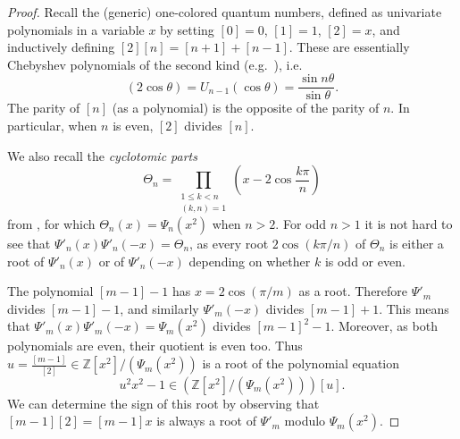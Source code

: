\documentclass{amsart}
\theoremstyle{plain}
\theoremstyle{definition}
\theoremstyle{remark}
\numberwithin{equation}{section}
\newcommand{\defnemph}[1]{\emph{#1}}
\newcommand{\ZZ}{\mathbb{Z}}
\begin{document}
\begin{proof}
Recall the (generic) one-colored quantum numbers, defined as univariate polynomials in a variable $x$ by setting $[0]=0$, $[1]=1$, $[2]=x$, and inductively defining $[2][n]=[n+1]+[n-1]$.
These are essentially Chebyshev polynomials of the second kind (e.g.~\cite[\S 3]{2colJW}), i.e.
\begin{equation*}
[n](2\cos \theta)=U_{n-1}(\cos \theta)=\frac{\sin n\theta}{\sin \theta} \text{.} %
\end{equation*}
The parity of $[n]$ (as a polynomial) is the opposite of the parity of $n$. 
In particular, when $n$ is even, $[2]$ divides $[n]$.

We also recall the \defnemph{cyclotomic parts}
\begin{equation*}
\Theta_n = \prod_{\substack{1 \leq k<n\\ (k,n)=1}} \left(x-2\cos \frac{k\pi}{n}\right)
\end{equation*}
from \cite[\S 3]{2colJW}, for which $\Theta_n(x)=\Psi_n(x^2)$ when $n>2$. 
For odd $n>1$ it is not hard to see that $\Psi'_n(x)\Psi'_n(-x)=\Theta_n$, as every root $2\cos(k\pi/n)$ of $\Theta_n$ is either a root of $\Psi'_n(x)$ or of $\Psi'_n(-x)$ depending on whether $k$ is odd or even.

The polynomial $[m-1]-1$ has $x=2\cos(\pi/m)$ as a root. 
Therefore $\Psi'_m$ divides $[m-1]-1$, and similarly $\Psi'_m(-x)$ divides $[m-1]+1$. 
This means that $\Psi'_m(x)\Psi'_m(-x)=\Psi_m(x^2)$ divides $[m-1]^2-1$. 
Moreover, as both polynomials are even, their quotient is even too.
Thus $u=\frac{[m-1]}{[2]} \in \ZZ[x^2]/(\Psi_m(x^2))$ is a root of the polynomial equation
\begin{equation}
u^2 x^2 - 1 \in (\ZZ[x^2]/(\Psi_m(x^2)))[u] \text{.} \label{eq:invsqroot}
\end{equation}
We can determine the sign of this root by observing that $[m-1][2]=[m-1]x$ is always a root of $\Psi'_m$ modulo $\Psi_m(x^2)$.


\end{proof}
\end{document}

